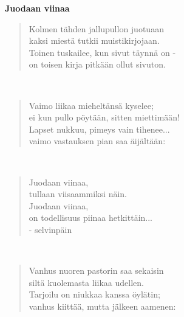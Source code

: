 \noindent\begin{minipage}{\linewidth}
\vspace{5pt}
\parbox[t]{0.85\linewidth}{\raggedright {\large\bf Juodaan viinaa}\\[6pt]}
\begin{verse}
	Kolmen tähden jallupullon juotuaan\\
	kaksi miestä tutkii muistikirjojaan.\\
	Toinen tuskailee, kun sivut täynnä on -\\
	on toisen kirja pitkään ollut sivuton.\\
\end{verse}
\end{minipage}\\[10pt]
\noindent\begin{minipage}{\linewidth}
\begin{verse}
	Vaimo liikaa mieheltänsä kyselee;\\
	ei kun pullo pöytään, sitten miettimään!\\
	Lapset nukkuu, pimeys vain tihenee...\\
	vaimo vastauksen pian saa äijältään:\\
\end{verse}
\end{minipage}\\[10pt]
\noindent\begin{minipage}{\linewidth}
\begin{verse}
	Juodaan viinaa,\\
	tullaan viisaammiksi näin.\\
	Juodaan viinaa,\\
	on todellisuus piinaa hetkittäin...\\
	- selvinpäin\\
\end{verse}
\end{minipage}\\[10pt]
\noindent\begin{minipage}{\linewidth}
\begin{verse}
	Vanhus nuoren pastorin saa sekaisin\\
	siltä kuolemasta liikaa udellen.\\
	Tarjoilu on niukkaa kanssa öylätin;\\
	vanhus kiittää, mutta jälkeen aamenen:\\
\end{verse}
\end{minipage}\\[10pt]
